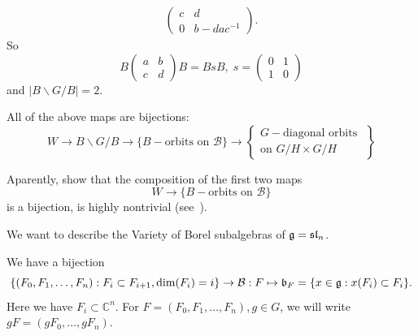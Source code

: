 \begin{itemize}
\begin{example}
\begin{equation}
\begin{split}
\begin{pmatrix}
                    c&d\\0&b-dac^{-1}
                \end{pmatrix}.
            \end{split}
        \end{equation}
        So  
        \begin{equation}
            B \begin{pmatrix}
                    a&b\\c&d
                \end{pmatrix}B = BsB,\; s =  \begin{pmatrix}
                    0&1\\1&0
                \end{pmatrix}
        \end{equation}
        and $|B\backslash G/B|=2$.
    \end{example}
    \begin{theorem}
        All of the above maps are bijections:
        \begin{equation}
            W \to B\backslash G/B\to \{B-\text{orbits on }\mathcal{B}\}\to
              \left\{\begin{matrix}G-\text{diagonal orbits }\\\text{on }G/H\times G/H\end{matrix}\right\}
        \end{equation}
    \end{theorem}
    \begin{remark}
        Aparently, show that the composition of the first two maps 
        \begin{equation}
            W \to \{B-\text{orbits on }\mathcal{B}\}
        \end{equation}
        is a bijection, is highly nontrivial (see~\cite{chriss1997representation}).
    \end{remark}
\end{itemize}
We want to describe the Variety of Borel subalgebras of $\mathfrak{g}=\mathfrak{sl}_n$. 
\begin{dang}
    \begin{lemma}
    We have a bijection 
\begin{equation}
    \{(F_0,F_1,\dots, F_n):F_i\subset F_{i+1},\dim(F_i)=i\}\to\mathcal{B}:F\mapsto \mathfrak{b}_F=\{x\in\mathfrak{g}:x(F_i)\subset F_i\}.
\end{equation}
Here we have $F_i\subset \mathbb{C}^n$. 
For $F = (F_0,F_1,\dots, F_n),g\in G$, we will write $gF=(gF_0,\dots, gF_n)$.
\end{lemma}
\end{dang}
